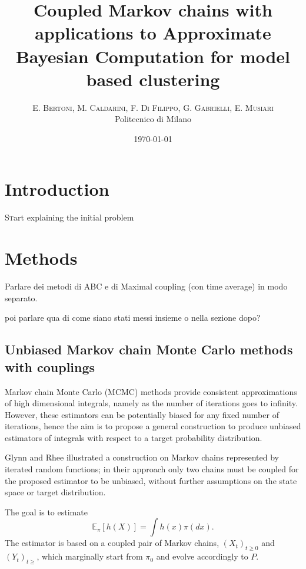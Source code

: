 \documentclass[twoside,twocolumn]{article}
\title{Coupled Markov chains with applications to Approximate Bayesian Computation for model based clustering} %
\author{%
\textsc{E. Bertoni, M. Caldarini, F. Di Filippo, G. Gabrielli, E. Musiari} \\[1ex] %
\normalsize Politecnico di Milano \\ %
}
\date{\today} %
\begin{document}
\maketitle


\section{Introduction}

\lettrine[nindent=0em,lines=3]{S}tart explaining the initial problem


\section{Methods}

Parlare dei metodi di ABC e di Maximal coupling (con time average) in modo separato.

poi parlare qua di come siano stati messi insieme o nella sezione dopo?

\subsection{Unbiased Markov chain Monte Carlo methods with couplings}


Markov chain Monte Carlo (MCMC) methods provide consistent approximations of high dimensional integrals, namely as the number of iterations goes to infinity. However, these estimators can be potentially biased for any fixed number of iterations, hence the aim is to propose a general construction to produce unbiased estimators of integrals with respect to a target probability distribution. 

Glynn and Rhee \cite{glynnrhee} illustrated a construction on Markov chains represented by iterated random functions; in their approach only two chains must be coupled for the proposed estimator to be unbiased, without further assumptions on the state space or target distribution.

The goal is to estimate
$$
\mathbb{E}_{\pi}[h(X)] 
= \int h(x) \pi (d x)
.
$$
The estimator is based on a coupled pair of Markov chains, $(X_t)_{t\geq 0}$ and $(Y_t)_{t\geq}$, which marginally start from $\pi_0$ and evolve accordingly to $P$.\\ 
\end{document}
